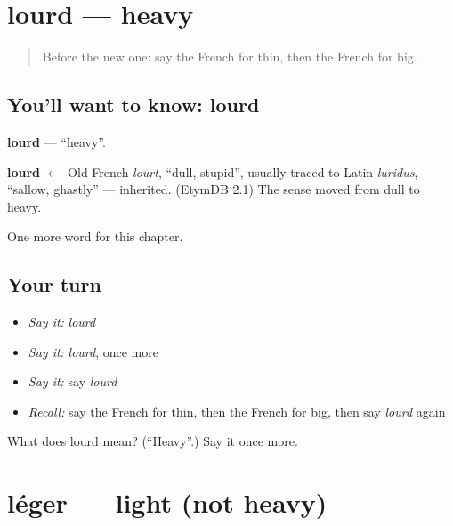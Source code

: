 \section[lourd]{lourd — heavy}

\label{lesson:FR-C93-lourd}



\begin{quote}
Before the new one: say the French for thin, then the French for big.
\end{quote}

\subsection*{You'll want to know: lourd}
\textbf{lourd} — \textquotedblleft{}heavy\textquotedblright{}.

\begin{cousinweb}
\textbf{lourd} $\leftarrow$ Old French \emph{lourt}, \textquotedblleft{}dull, stupid\textquotedblright{}, usually traced to Latin \emph{luridus}, \textquotedblleft{}sallow, ghastly\textquotedblright{} — inherited. (EtymDB 2.1) The sense moved from dull to heavy.
\end{cousinweb}

\begin{grammarlens}[title={What you've built}]
One more word for this chapter.
\end{grammarlens}

\subsection*{Your turn}
\begin{itemize}
\raggedright
  \item \emph{Say it:} \emph{lourd}
  \item \emph{Say it:} \emph{lourd}, once more
  \item \emph{Say it:} say \emph{lourd}
  \item \emph{Recall:} say the French for thin, then the French for big, then say \emph{lourd} again
\end{itemize}

\begin{tcolorbox}[breakable,colback=teal!4,colframe=teal!35!black,title={Before you move on}]
What does lourd mean? (\textquotedblleft{}Heavy\textquotedblright{}.) Say it once more.
\end{tcolorbox}
\section[léger]{léger — light (not heavy)}

